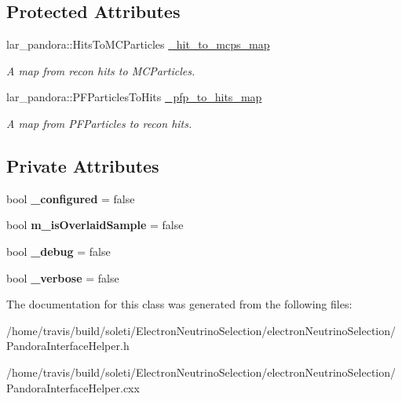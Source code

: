\subsection*{Protected Attributes}
\begin{DoxyCompactItemize}
\item 
\hypertarget{group__lee_gadd430a976fa40632e14eb1688cdd785b}{lar\-\_\-pandora\-::\-Hits\-To\-M\-C\-Particles \hyperlink{group__lee_gadd430a976fa40632e14eb1688cdd785b}{\-\_\-hit\-\_\-to\-\_\-mcps\-\_\-map}}\label{group__lee_gadd430a976fa40632e14eb1688cdd785b}

\begin{DoxyCompactList}\small\item\em A map from recon hits to M\-C\-Particles. \end{DoxyCompactList}\item 
\hypertarget{group__lee_gae19df94cb2c29dc2735bf7436c5ccf63}{lar\-\_\-pandora\-::\-P\-F\-Particles\-To\-Hits \hyperlink{group__lee_gae19df94cb2c29dc2735bf7436c5ccf63}{\-\_\-pfp\-\_\-to\-\_\-hits\-\_\-map}}\label{group__lee_gae19df94cb2c29dc2735bf7436c5ccf63}

\begin{DoxyCompactList}\small\item\em A map from P\-F\-Particles to recon hits. \end{DoxyCompactList}\end{DoxyCompactItemize}
\subsection*{Private Attributes}
\begin{DoxyCompactItemize}
\item 
\hypertarget{group__lee_ga2adc9100d7afd42201e3b158c537231c}{bool {\bfseries \-\_\-configured} = false}\label{group__lee_ga2adc9100d7afd42201e3b158c537231c}

\item 
\hypertarget{group__lee_ga406cf8f7ace556f0b1dcfb9e4722efb8}{bool {\bfseries m\-\_\-is\-Overlaid\-Sample} = false}\label{group__lee_ga406cf8f7ace556f0b1dcfb9e4722efb8}

\item 
\hypertarget{group__lee_gab8e095d1281cac84da211ba143991440}{bool {\bfseries \-\_\-debug} = false}\label{group__lee_gab8e095d1281cac84da211ba143991440}

\item 
\hypertarget{group__lee_ga39213dbd10338e8fefb3b6756f2e9cb3}{bool {\bfseries \-\_\-verbose} = false}\label{group__lee_ga39213dbd10338e8fefb3b6756f2e9cb3}

\end{DoxyCompactItemize}


The documentation for this class was generated from the following files\-:\begin{DoxyCompactItemize}
\item 
/home/travis/build/soleti/\-Electron\-Neutrino\-Selection/electron\-Neutrino\-Selection/Pandora\-Interface\-Helper.\-h\item 
/home/travis/build/soleti/\-Electron\-Neutrino\-Selection/electron\-Neutrino\-Selection/Pandora\-Interface\-Helper.\-cxx\end{DoxyCompactItemize}
